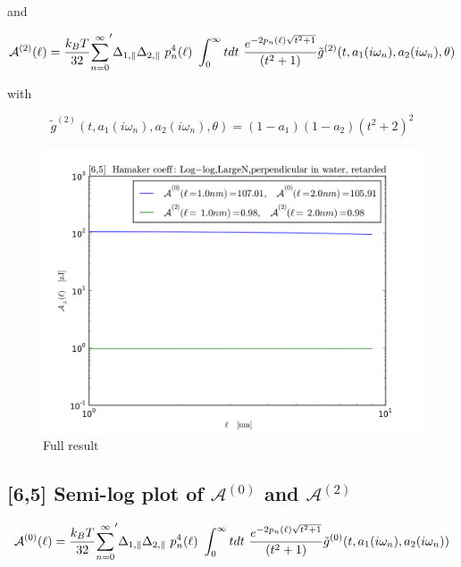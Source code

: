 \documentclass[a4paper]{article}
\begin{document}
\begin{center}

and

\begin{equation}
{\cal A}^{(2)}(\ell) = \frac{k_BT}{32}  {\sum_{n=0}^{\infty}}' \Delta_{1,\parallel} \Delta_{2,\parallel} ~p_n^{4}(\ell) ~\int_0^{\infty} t dt ~\frac{e^{- 2 p_n(\ell) \sqrt{t^{2} + 1}}}{(t^{2} + 1)} \tilde g^{(2)}(t, a_1(i \omega_n), a_2(i \omega_n), \theta)
\end{equation}

with

\begin{equation}
\tilde g^{(2)}(t, a_1(i \omega_n), a_2(i \omega_n), \theta) = (1-a_1)(1-a_2)(t^{2} + 2)^2
\label{befgqw}
\end{equation}

\begin{figure}[t!]
\begin{center}
\includegraphics[width=1.2\textwidth]{large_N/140322_65w65_HCs_perpendicular_ret_lrg_n.png}
\hskip 43pt
\caption{Full result} 
\label{eiz65}
\end{center}
\end{figure} 

\subsection{[6,5] Semi-log plot of $\mathcal{A}^{(0)}$ and $\mathcal{A}^{(2)}$ }
\begin{equation}
{\cal A}^{(0)}(\ell) = \frac{k_BT}{32}  {\sum_{n=0}^{\infty}}' \Delta_{1,\parallel} \Delta_{2,\parallel} ~p_n^{4}(\ell) ~\int_0^{\infty} t dt ~\frac{e^{- 2 p_n(\ell) \sqrt{t^{2} + 1}}}{(t^{2} + 1)} \tilde g^{(0)}(t, a_1(i \omega_n), a_2(i \omega_n))
\end{equation}


\end{center}
\end{document}

